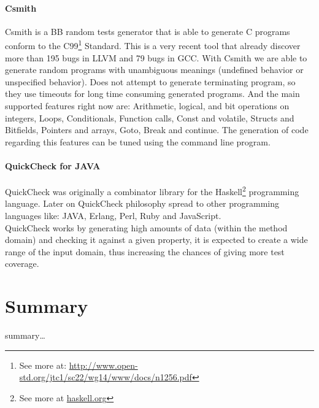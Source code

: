 \paragraph{Csmith}
Csmith\cite{Yang:2011:FUB:1993316.1993532} is a \ac{BB} random tests generator that is able to generate C programs
conform to the C99\footnote{See more at: \url{http://www.open-std.org/jtc1/sc22/wg14/www/docs/n1256.pdf}} Standard. This is a very recent tool that already discover
more than 195 bugs in \ac{LLVM} and 79 bugs in \ac{GCC}. With Csmith we are able to generate random programs with unambiguous meanings (undefined behavior or 
unspecified behavior). Does not attempt to generate terminating program, so they use timeouts for long time consuming generated programs.
And the main supported features right now are: Arithmetic, logical, and bit operations on integers, Loops, Conditionals, Function calls, Const and volatile,
Structs and Bitfields, Pointers and arrays, Goto, Break and continue. The generation of code regarding this features can be tuned using the command line program.

\paragraph{QuickCheck for JAVA}
QuickCheck was originally a combinator library for the Haskell\footnote{See more at \url{haskell.org}} programming language\cite{Claessen:2000:QLT:357766.351266}.
Later on QuickCheck philosophy spread to other programming languages like: JAVA, Erlang, Perl, Ruby and JavaScript.\\
QuickCheck works by generating high amounts of data (within the method domain) and checking it against a given property,
it is expected to create a wide range of the input domain, thus increasing the chances of giving more test coverage.

\section{Summary}
summary\ldots
\secendnote
